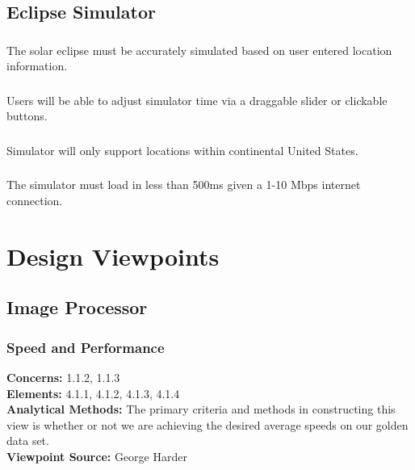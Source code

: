 \documentclass[10pt, onecolumn, draftclsnofoot, letterpaper, compsoc]{IEEEtran}
\begin{document}
\subsection{Eclipse Simulator}
    \subsubsection{}
    The solar eclipse must be accurately simulated based on
    user entered location information. \\

    \subsubsection{}
    Users will be able to adjust simulator time via a
    draggable slider or clickable buttons. \\

    \subsubsection{}
    Simulator will only support locations within continental
    United States. \\

    \subsubsection{}
    The simulator must load in less than 500ms given a 1-10
    Mbps internet connection. \\


\section{Design Viewpoints}

\subsection{Image Processor}

\subsubsection{Speed and Performance}

\textbf{Concerns:} 1.1.2, 1.1.3 \\
\textbf{Elements:} 4.1.1, 4.1.2, 4.1.3, 4.1.4\\
\textbf{Analytical Methods:} The primary criteria and methods in constructing
this view is whether or not we are achieving the desired average speeds on our
golden data set. \\
\textbf{Viewpoint Source:} George Harder \\
\end{document}
